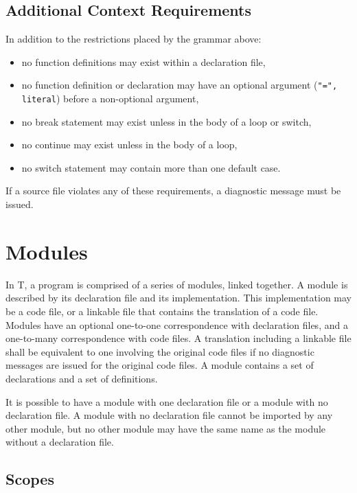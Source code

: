 \documentclass[letterpaper,12pt]{book}
\begin{document}
\section{Additional Context Requirements}

In addition to the restrictions placed by the grammar above:
\begin{itemize}
	\item no function definitions may exist within a declaration file,
	\item no function definition or declaration may have an optional argument (\texttt{"=", literal}) before a non-optional argument,
	\item no break statement may exist unless in the body of a loop or switch,
	\item no continue may exist unless in the body of a loop,
	\item no switch statement may contain more than one default case.
\end{itemize}

If a source file violates any of these requirements, a diagnostic message must be issued.

\chapter{Modules}

In T, a program is comprised of a series of modules, linked together. A module is described by its declaration file and its implementation. This implementation may be a code file, or a linkable file that contains the translation of a code file. Modules have an optional one-to-one correspondence with declaration files, and a one-to-many correspondence with code files. A translation including a linkable file shall be equivalent to one involving the original code files if no diagnostic messages are issued for the original code files. A module contains a set of declarations and a set of definitions.

It is possible to have a module with one declaration file or a module with no declaration file. A module with no declaration file cannot be imported by any other module, but no other module may have the same name as the module without a declaration file.

\section{Scopes}
\end{document}
